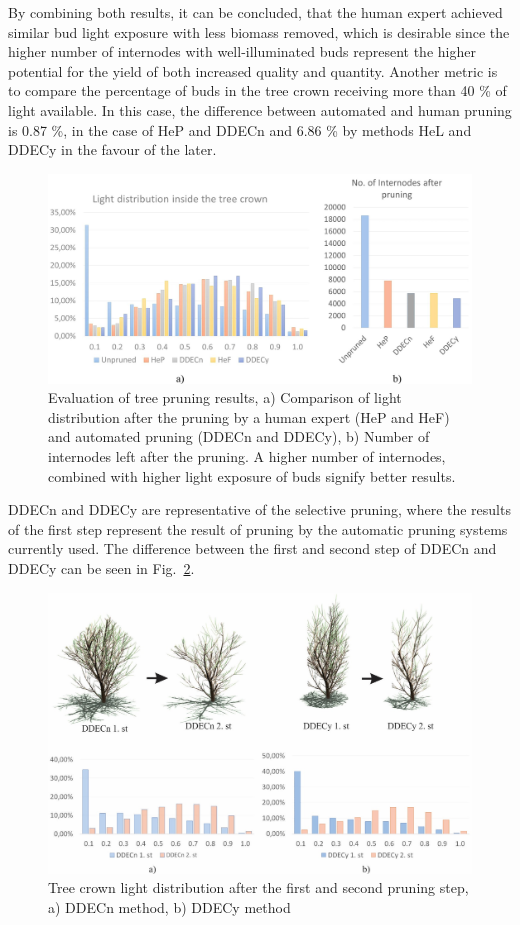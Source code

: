 \documentclass[1p]{elsarticle}
\begin{document}
By combining both results, it can be concluded, that the human expert
achieved similar bud light exposure with less biomass removed,
which is desirable since the higher number of internodes with
well-illuminated buds represent the higher potential for the yield of
both increased quality and quantity. Another metric is to compare the
percentage of buds in the tree crown receiving more than 40 \% of light
available. In this case, the difference between automated and human
pruning is 0.87 \%, in the case of HeP and DDECn and 6.86 \% by methods HeL and DDECy in the favour of the later.

\begin{figure}[hbt]
    \centering
    \includegraphics[width=5in]{figs/image5.jpeg}
    \caption{Evaluation of tree pruning results, a) Comparison of
light distribution after the pruning by a human expert (HeP and HeF) and
automated pruning (DDECn and DDECy), b) Number of internodes left after
the pruning. A higher number of internodes, combined with higher light
exposure of buds signify better results.}
\label{fig:my_figure5}
\end{figure}

DDECn and DDECy are representative of the selective pruning, where the
results of the first step represent the result of pruning by the
automatic pruning systems currently used. The difference between the
first and second step of DDECn and DDECy can be seen in Fig.~\ref{fig:my_figure6}.

\begin{figure}[hbt]
    \centering
    \includegraphics[width=5.4in]{figs/image6.jpeg}
    \caption{Tree crown light distribution after the first and
second pruning step, a) DDECn method, b) DDECy method}
    \label{fig:my_figure6}
\end{figure}
\end{document}
